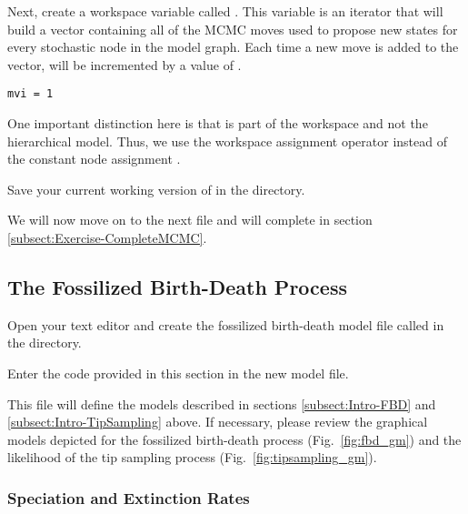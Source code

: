 Next, create a workspace variable called . 
This variable is an iterator that will build a vector containing all of the MCMC moves used to propose new states for every stochastic node in the model graph. 
Each time a new move is added to the vector,  will be incremented by a value of .
{\tt \begin{snugshade*}
\begin{lstlisting}
mvi = 1
\end{lstlisting}
\end{snugshade*}}
One important distinction here is that  is part of the \RevBayes workspace and not the hierarchical model. 
Thus, we use the workspace assignment operator \cl{=} instead of the constant node assignment \cl{<-}. 

{\begin{framed}
Save your current working version of  in the  directory.

We will now move on to the next \Rev file and will complete  in section \ref{subsect:Exercise-CompleteMCMC}.
\end{framed}}


\bigskip
\subsection{The Fossilized Birth-Death Process}\label{subsect:Exercise-ModelFBD}

{\begin{framed}
Open your text editor and create the fossilized birth-death model file called {\textcolor{red}{}} in the  directory.

Enter the \Rev code provided in this section in the new model file.
\end{framed}}

This file will define the models described in sections \ref{subsect:Intro-FBD} and \ref{subsect:Intro-TipSampling} above.
If necessary, please review the graphical models depicted for the fossilized birth-death process (Fig.\ \ref{fig:fbd_gm}) and the likelihood of the tip sampling process (Fig.\ \ref{fig:tipsampling_gm}).

\subsubsection{Speciation and Extinction Rates}\label{subsub:Exercise-FBD-SpeciationExtinction}

